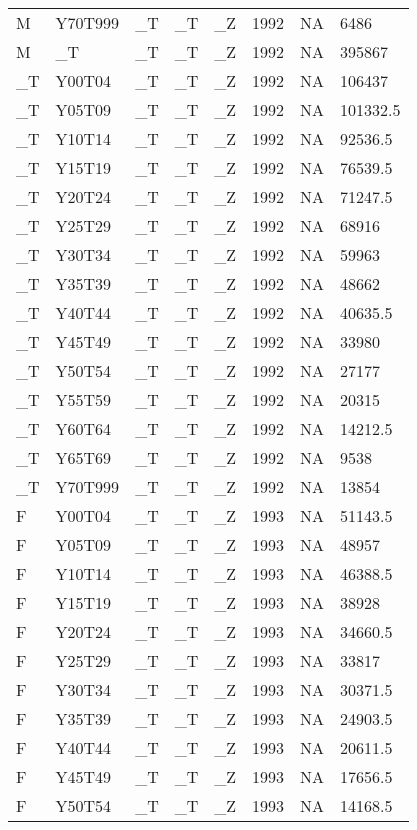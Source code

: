 \begin{longtable}[t]{llllllll}
M & Y70T999 & \_T & \_T & \_Z & 1992 & NA & 6486\\
\addlinespace
M & \_T & \_T & \_T & \_Z & 1992 & NA & 395867\\
\_T & Y00T04 & \_T & \_T & \_Z & 1992 & NA & 106437\\
\_T & Y05T09 & \_T & \_T & \_Z & 1992 & NA & 101332.5\\
\_T & Y10T14 & \_T & \_T & \_Z & 1992 & NA & 92536.5\\
\_T & Y15T19 & \_T & \_T & \_Z & 1992 & NA & 76539.5\\
\addlinespace
\_T & Y20T24 & \_T & \_T & \_Z & 1992 & NA & 71247.5\\
\_T & Y25T29 & \_T & \_T & \_Z & 1992 & NA & 68916\\
\_T & Y30T34 & \_T & \_T & \_Z & 1992 & NA & 59963\\
\_T & Y35T39 & \_T & \_T & \_Z & 1992 & NA & 48662\\
\_T & Y40T44 & \_T & \_T & \_Z & 1992 & NA & 40635.5\\
\addlinespace
\_T & Y45T49 & \_T & \_T & \_Z & 1992 & NA & 33980\\
\_T & Y50T54 & \_T & \_T & \_Z & 1992 & NA & 27177\\
\_T & Y55T59 & \_T & \_T & \_Z & 1992 & NA & 20315\\
\_T & Y60T64 & \_T & \_T & \_Z & 1992 & NA & 14212.5\\
\_T & Y65T69 & \_T & \_T & \_Z & 1992 & NA & 9538\\
\addlinespace
\_T & Y70T999 & \_T & \_T & \_Z & 1992 & NA & 13854\\
F & Y00T04 & \_T & \_T & \_Z & 1993 & NA & 51143.5\\
F & Y05T09 & \_T & \_T & \_Z & 1993 & NA & 48957\\
F & Y10T14 & \_T & \_T & \_Z & 1993 & NA & 46388.5\\
F & Y15T19 & \_T & \_T & \_Z & 1993 & NA & 38928\\
\addlinespace
F & Y20T24 & \_T & \_T & \_Z & 1993 & NA & 34660.5\\
F & Y25T29 & \_T & \_T & \_Z & 1993 & NA & 33817\\
F & Y30T34 & \_T & \_T & \_Z & 1993 & NA & 30371.5\\
F & Y35T39 & \_T & \_T & \_Z & 1993 & NA & 24903.5\\
F & Y40T44 & \_T & \_T & \_Z & 1993 & NA & 20611.5\\
\addlinespace
F & Y45T49 & \_T & \_T & \_Z & 1993 & NA & 17656.5\\
F & Y50T54 & \_T & \_T & \_Z & 1993 & NA & 14168.5\\

\end{longtable}
